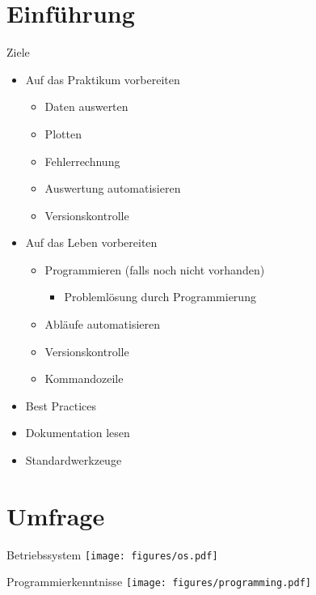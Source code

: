\section{Einführung}

\begin{frame}{Ziele}
  \begin{itemize}
    \item Auf das Praktikum vorbereiten
      \begin{itemize}
        \item Daten auswerten
        \item Plotten
        \item Fehlerrechnung
        \item Auswertung automatisieren
        \item Versionskontrolle
      \end{itemize}
    \item Auf das Leben vorbereiten
      \begin{itemize}
        \item Programmieren (falls noch nicht vorhanden)
          \begin{itemize}
            \item Problemlösung durch Programmierung
          \end{itemize}
        \item Abläufe automatisieren
        \item Versionskontrolle
        \item Kommandozeile
      \end{itemize}
    \item Best Practices
    \item Dokumentation lesen
    \item Standardwerkzeuge
  \end{itemize}
\end{frame}

\section{Umfrage}

\begin{frame}{Betriebssystem}
  \centering
  \texttt{[image: figures/os.pdf]}
\end{frame}

\begin{frame}{Programmierkenntnisse}
  \centering
  \texttt{[image: figures/programming.pdf]}
\end{frame}

